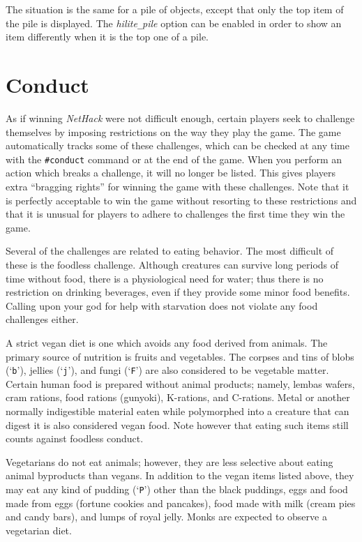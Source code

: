 The situation is the same for a pile of objects, except that only the
top item of the pile is displayed.
The
{\it hilite\verb+_+pile\/}
option can be enabled in order to show an item differently when it is
the top one of a pile.

\section{Conduct}

As if winning {\it NetHack\/} were not difficult enough, certain players
seek to challenge themselves by imposing restrictions on the
way they play the game.  The game automatically tracks some of
these challenges, which can be checked at any time with the {\tt \#conduct}
command or at the end of the game.  When you perform an action which
breaks a challenge, it will no longer be listed.  This gives
players extra ``bragging rights'' for winning the game with these
challenges.  Note that it is perfectly acceptable to win the game
without resorting to these restrictions and that it is unusual for
players to adhere to challenges the first time they win the game.

Several of the challenges are related to eating behavior.  The most
difficult of these is the foodless challenge.  Although creatures
can survive long periods of time without food, there is a physiological
need for water; thus there is no restriction on drinking beverages,
even if they provide some minor food benefits.
Calling upon your god for help with starvation does
not violate any food challenges either.

A strict vegan diet is one which avoids any food derived from animals.
The primary source of nutrition is fruits and vegetables.  The
corpses and tins of blobs (`{\tt b}'), jellies (`{\tt j}'), and fungi
(`{\tt F}') are also considered to be vegetable matter.  Certain human
food is prepared without animal products; namely, lembas wafers, cram
rations, food rations (gunyoki), K-rations, and C-rations.
Metal or another normally indigestible material eaten while polymorphed
into a creature that can digest it is also considered vegan food.
Note however that eating such items still counts against foodless conduct.

Vegetarians do not eat animals;
however, they are less selective about eating animal byproducts than vegans.
In addition to the vegan items listed above, they may eat any kind
of pudding (`{\tt P}') other than the black puddings,
eggs and food made from eggs (fortune cookies and pancakes),
food made with milk (cream pies and candy bars), and lumps of
royal jelly.  Monks are expected to observe a vegetarian diet.


